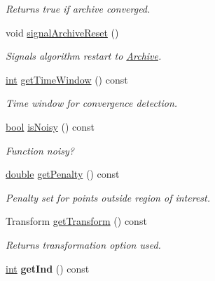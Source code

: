 \begin{DoxyCompactItemize}
\begin{DoxyCompactList}\small\item\em Returns true if archive converged. \end{DoxyCompactList}\item 
void \hyperlink{classCOCOfunc_aa05f6328202055ad1775bfc702138d57}{signal\+Archive\+Reset} ()\hypertarget{classCOCOfunc_aa05f6328202055ad1775bfc702138d57}{}\label{classCOCOfunc_aa05f6328202055ad1775bfc702138d57}

\begin{DoxyCompactList}\small\item\em Signals algorithm restart to \hyperlink{classArchive}{Archive}. \end{DoxyCompactList}\item 
\hyperlink{classint}{int} \hyperlink{classCOCOfunc_a564ba29a6578acbf448b6d4637dba5e6}{get\+Time\+Window} () const\hypertarget{classCOCOfunc_a564ba29a6578acbf448b6d4637dba5e6}{}\label{classCOCOfunc_a564ba29a6578acbf448b6d4637dba5e6}

\begin{DoxyCompactList}\small\item\em Time window for convergence detection. \end{DoxyCompactList}\item 
\hyperlink{classbool}{bool} \hyperlink{classCOCOfunc_aebf2679b94c68a5dd00bfbe2e65ae03c}{is\+Noisy} () const\hypertarget{classCOCOfunc_aebf2679b94c68a5dd00bfbe2e65ae03c}{}\label{classCOCOfunc_aebf2679b94c68a5dd00bfbe2e65ae03c}

\begin{DoxyCompactList}\small\item\em Function noisy? \end{DoxyCompactList}\item 
\hyperlink{classdouble}{double} \hyperlink{classCOCOfunc_a1bca22ed36ffb8b1e1a3c3ba6d28474a}{get\+Penalty} () const\hypertarget{classCOCOfunc_a1bca22ed36ffb8b1e1a3c3ba6d28474a}{}\label{classCOCOfunc_a1bca22ed36ffb8b1e1a3c3ba6d28474a}

\begin{DoxyCompactList}\small\item\em Penalty set for points outside region of interest. \end{DoxyCompactList}\item 
Transform \hyperlink{classCOCOfunc_a45ba191b9c22159ef160c56b7bb84e47}{get\+Transform} () const\hypertarget{classCOCOfunc_a45ba191b9c22159ef160c56b7bb84e47}{}\label{classCOCOfunc_a45ba191b9c22159ef160c56b7bb84e47}

\begin{DoxyCompactList}\small\item\em Returns transformation option used. \end{DoxyCompactList}\item 
\hyperlink{classint}{int} {\bfseries get\+Ind} () const\hypertarget{classCOCOfunc_adcc87a3ee718a74a2fbb715501a2592e}{}\label{classCOCOfunc_adcc87a3ee718a74a2fbb715501a2592e}

\end{DoxyCompactItemize}
